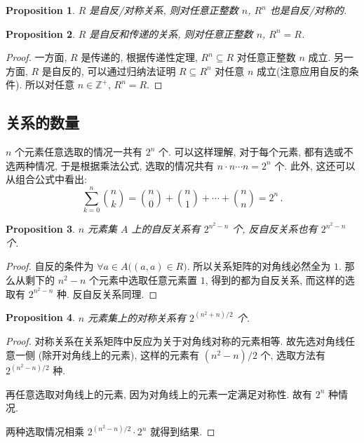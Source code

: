 \documentclass[UTF8]{ctexart}
\theoremstyle{mystyle}
\newtheorem{proposition}{Proposition}[section]
\theoremstyle{myremark}
\theoremstyle{plain}
\newcommand{\Z}{\mathbb Z}
\begin{document}
\begin{proposition}
    $ R $ 是自反/对称关系, 则对任意正整数 $ n $, $ R^n $ 也是自反/对称的.
\end{proposition}

\begin{proposition}
    $ R $ 是自反和传递的关系, 则对任意正整数 $ n $, $ R^n = R $.
\end{proposition}

\begin{proof}
    一方面, $ R $ 是传递的, 根据传递性定理, $ R^n \subseteq R $ 对任意正整数 $ n $ 成立. 另一方面, $ R $ 是自反的, 可以通过归纳法证明 $ R \subseteq R^n $ 对任意 $ n $ 成立(注意应用自反的条件). 所以对任意 $ n \in \Z^+ $, $ R^n = R $.
\end{proof}

\subsection{关系的数量}
$ n $ 个元素任意选取的情况一共有 $ 2^n $ 个. 可以这样理解, 对于每个元素, 都有选或不选两种情况, 于是根据乘法公式, 选取的情况共有 $ n \cdot n \cdots n = 2^n $ 个. 此外, 这还可以从组合公式中看出: \[ \sum_{k = 0}^n \binom{n}{k} = \binom{n}{0} + \binom{n}{1} + \cdots + \binom{n}{n} = 2^n \,.\] 

\begin{proposition}
    $ n $ 元素集 $ A $ 上的自反关系有 $ 2^{n^2 - n} $ 个, 反自反关系也有 $ 2^{n^2 - n} $ 个.
\end{proposition}

\begin{proof}
    自反的条件为 $ \forall a \in A \bigl( (a, a) \in R \bigr) $. 所以关系矩阵的对角线必然全为 $ 1 $. 那么从剩下的 $ n^2 - n $ 个元素中选取任意元素置 $ 1 $, 得到的都为自反关系, 而这样的选取有 $ 2^{n^2 - n} $ 种. 反自反关系同理. 
\end{proof}

\begin{proposition}
    $ n $ 元素集上的对称关系有 $ 2^{(n^2 + n) / 2} $ 个.
\end{proposition}

\begin{proof}
    对称关系在关系矩阵中反应为关于对角线对称的元素相等. 故先选对角线任意一侧 (除开对角线上的元素), 这样的元素有 $ (n^2 - n) / 2 $ 个, 选取方法有 $ 2^{(n^2 - n) / 2} $ 种.

    再任意选取对角线上的元素, 因为对角线上的元素一定满足对称性. 故有 $ 2^n $ 种情况.

    两种选取情况相乘 $ 2^{(n^2 - n) / 2} \cdot 2^{n} $ 就得到结果.
\end{proof}
\end{document}
